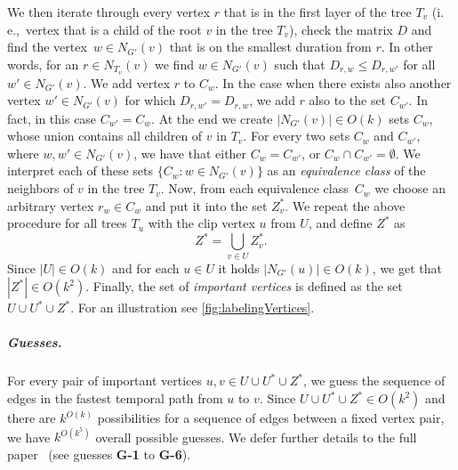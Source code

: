 \documentclass[a4paper,UKenglish,cleveref, autoref, thm-restate]{lipics-v2021}
\newcommand{\ie}{i.\,e.,\ }
\newcommand{\deltaExact}{\textsc{Simple TGR}}
\begin{document}
We then iterate through every vertex $r$ that is in the first layer of the tree $T_v$ (\ie vertex that is a child of the root $v$ in the tree $T_v$), check the matrix $D$ and find the vertex~$w \in N_{G'}(v)$ that is on the smallest duration from $r$.
In other words, for an $r \in N_{T_v}(v)$ we find $w \in N_{G'}(v)$ such that $D_{r,w} \leq D_{r,w'}$ for all $w' \in  N_{G'}(v)$.
%
We add vertex $r$ to $C_w$.
In the case when there exists also another vertex $w' \in  N_{G'}(v) $ for which $D_{r,w'} = D_{r,w}$, we add $r$ also to the set $C_{w'}$. In fact, in this case $C_{w'} = C_w$.
At the end we create $|N_{G'}(v)| \in O(k)$ sets $C_w$, whose union contains all children of $v$ in $T_v$. 
For every two sets $C_w$ and $C_{w'}$, where $w,w'\in N_{G'}(v)$, we have that either $C_w = C_{w'}$, or $C_w \cap C_{w'} = \emptyset$. 
We interpret each of these sets $\{C_w : w \in N_{G'}(v)\}$ as an \emph{equivalence class} of the neighbors of $v$ in the tree $T_v$. 
Now, from each equivalence class~$C_w$ we choose an arbitrary vertex $r_w \in C_w$ and put it into the set $Z^*_v$.
%
We repeat the above procedure for all trees $T_u$ with the clip vertex $u$ from $U$, and define $Z^*$ as 
\begin{equation}
    Z^* = \bigcup\limits_{v \in U} Z^*_v.
\end{equation}
%
Since $|U| \in O(k)$ and for each $u \in U$ it holds $|N_{G'}(u)| \in O(k)$, we get that $|Z^*| \in O(k^2)$. 
Finally, the set of \emph{important vertices} is defined as the set $U \cup U^{\ast} \cup Z^{\ast}$.
For an illustration see \cref{fig:labelingVertices}.





\subparagraph{Guesses.} 
For every pair of important vertices $u,v \in U \cup U^{\ast} \cup Z^{\ast}$, we guess the sequence of edges in the fastest temporal path from $u$ to $v$. Since $U \cup U^{\ast} \cup Z^{\ast}\in O(k^2)$ and there are $k^{O(k)}$ possibilities for a sequence of edges between a fixed vertex pair, we have $k^{O(k^5)}$ overall possible guesses. We  defer further details to the full paper~\cite{fullPaper} (see guesses \textcolor{lipicsGray}{\textsf{\textbf{G-1}}} to \textcolor{lipicsGray}{\textsf{\textbf{G-6}}}).
\end{document}
